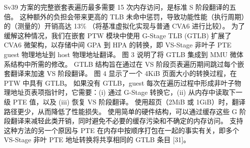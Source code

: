 Sv39 方案的完整嵌套表遍历最多需要 15 次内存访问，是标准 S 阶段翻译的五倍。 这种额外的负担会带来更高的 TLB 未命中惩罚，导致功能性能（执行周期）的（测量的）开销高达 13\%
（将基准虚拟化实现与普通 CVA6 进行比较）。 为了缓解这种情况，我们在嵌套 PTW 模块中使用 G-Stage TLB (GTLB) 扩展了 CVA6 微架构，以存储中间 GPA 到 HPA 的转换，即 VS-Stage 非叶子 PTE guest 物理地址到 host 物理地址翻译。 图 3 说明了将 GTLB 集成到 MMU 微体系结构中所需的修改。 GTLB 结构旨在通过在 VS 阶段页表遍历期间跳过每个嵌套翻译来加速 VS 阶段翻译。 图 4 显示了一个 4KiB 页面大小的转换过程，在 PTW 中具有 GTLB。 如果没有 GTLB，guest 每次在遍历过程中形成非叶子物理地址页表项指针时，它需要：(i) 通过 G-Stage 转换它，(ii) 从内存中读取下一级 PTE 值，以及 (iii) 恢复 VS 阶段翻译。 使用超页（2MiB 或 1GiB）时，翻译路径更少，从而降低了性能损失。 使用简单的硬件结构，可以通过缓存这些 G 阶段翻译来减轻此类开销，同时避免不必要的缓存污染和不确定的内存访问。 支持这种方法的另一个原因与 PTE 在内存中按顺序打包在一起的事实有关，即多个 VS-Stage 非叶 PTE 地址转换将共享相同的 GTLB 条目 [31]。











